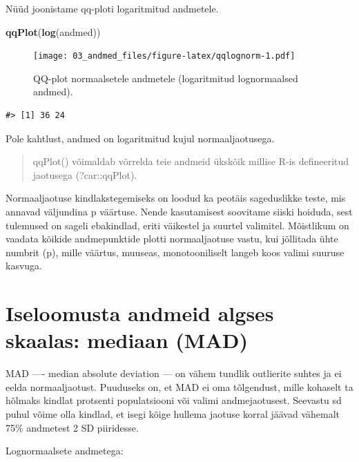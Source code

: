 \documentclass[]{book}
\newenvironment{Shaded}{\begin{snugshade}}{\end{snugshade}}
\newcommand{\KeywordTok}[1]{\textcolor[rgb]{0.13,0.29,0.53}{\textbf{#1}}}
\newcommand{\NormalTok}[1]{#1}
\begin{document}
Nüüd joonistame qq-ploti logaritmitud andmetele.




\begin{Shaded}
\begin{Highlighting}[]
\KeywordTok{qqPlot}\NormalTok{(}\KeywordTok{log}\NormalTok{(andmed))}
\end{Highlighting}
\end{Shaded}

\begin{figure}
\centering
\texttt{[image: 03\_andmed\_files/figure-latex/qqlognorm-1.pdf]}
\caption{\label{fig:qqlognorm}QQ-plot normaalsetele andmetele (logaritmitud
lognormaalsed andmed).}
\end{figure}

\begin{verbatim}
#> [1] 36 24
\end{verbatim}

Pole kahtlust, andmed on logaritmitud kujul normaaljaotusega.

\begin{quote}
qqPlot() võimaldab võrrelda teie andmeid ükskõik millise R-is
defineeritud jaotusega (?car::qqPlot).
\end{quote}

Normaaljaotuse kindlakstegemiseks on loodud ka peotäis sageduslikke
teste, mis annavad väljundina p väärtuse. Nende kasutamisest soovitame
siiski hoiduda, sest tulemused on sageli ebakindlad, eriti väikestel ja
suurtel valimitel. Mõistlikum on vaadata kõikide andmepunktide plotti
normaaljaotuse vastu, kui jõllitada ühte numbrit (p), mille väärtus,
muuseas, monotooniliselt langeb koos valimi suuruse kasvuga.

\section*{Iseloomusta andmeid algses skaalas: mediaan
(MAD)}\label{iseloomusta-andmeid-algses-skaalas-mediaan-mad}

MAD ---- median absolute deviation --- on vähem tundlik outlierite
suhtes ja ei eelda normaaljaotust. Puuduseks on, et MAD ei oma
tõlgendust, mille kohaselt ta hõlmaks kindlat protsenti populatsiooni
või valimi andmejaotusest. Seevastu sd puhul võime olla kindlad, et
isegi kõige hullema jaotuse korral jäävad vähemalt 75\% andmetest 2 SD
piiridesse.

Lognormaalsete andmetega:
\end{document}
